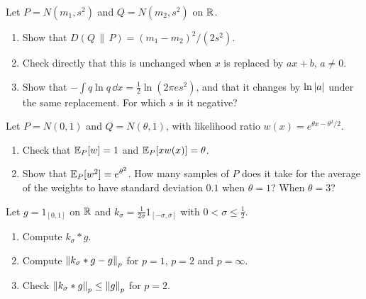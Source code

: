 \begin{notechapter}
\begin{exercise}\label{lp-spaces:exr:8}
Let $P = N(m_1, s^2)$ and $Q = N(m_2, s^2)$ on $\mathbb{R}$.
\begin{enumerate}[nosep]
  \item Show that $D(Q\,\|\,P) = (m_1 - m_2)^2/(2s^2)$.
  \item Check directly that this is unchanged when $x$ is replaced by
        $ax + b$, $a\neq0$.
  \item Show that $-\int q\ln q\,\dd x = \frac12\ln(2\pi es^2)$, and
        that it changes by $\ln\left|a\right|$ under the same replacement. For
        which $s$ is it negative?
\end{enumerate}
\end{exercise}

\begin{exercise}\label{lp-spaces:exr:9}
Let $P = N(0, 1)$ and $Q = N(\theta, 1)$, with likelihood ratio
$w(x) = e^{\theta x - \theta^2/2}$.
\begin{enumerate}[nosep]
  \item Check that $\mathbb{E}_P[w] = 1$ and $\mathbb{E}_P[xw(x)] = \theta$.
  \item Show that $\mathbb{E}_P[w^2] = e^{\theta^2}$. How many samples of $P$
        does it take for the average of the weights to have standard
        deviation $0.1$ when $\theta = 1$? When $\theta = 3$?
\end{enumerate}
\end{exercise}

\begin{exercise}\label{lp-spaces:exr:10}
Let $g = 1_{[0, 1]}$ on $\mathbb{R}$ and
$k_\sigma = \frac1{2\sigma}1_{[-\sigma, \sigma]}$ with
$0 < \sigma\leq\frac12$.
\begin{enumerate}[nosep]
  \item Compute $k_\sigma*g$.
  \item Compute $\left\|k_\sigma*g - g\right\|_p$ for $p = 1$, $p = 2$ and
        $p = \infty$.
  \item Check $\left\|k_\sigma*g\right\|_p\leq\left\|g\right\|_p$ for $p = 2$.
\end{enumerate}
\end{exercise}
\end{notechapter}
